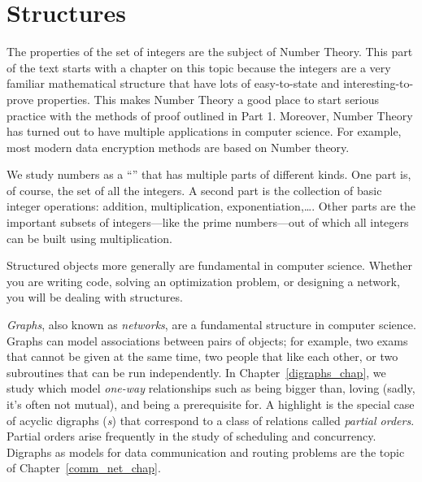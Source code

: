 \part{Structures}
\label{part:structures}

\partintro
{}

The properties of the set of integers are the subject of Number
Theory.  This part of the text starts with a chapter on this topic
because the integers are a very familiar mathematical structure that
have lots of easy-to-state and interesting-to-prove properties.  This
makes Number Theory a good place to start serious practice with the
methods of proof outlined in Part 1.  Moreover, Number Theory has
turned out to have multiple applications in computer science.  For
example, most modern data encryption methods are based on Number
theory.

We study numbers as a ``'' that has multiple parts of
different kinds.  One part is, of course, the set of all the integers.
A second part is the collection of basic integer operations:
addition, multiplication, exponentiation,\dots.  Other parts are the
important subsets of integers---like the prime numbers---out of which
all integers can be built using multiplication.

Structured objects more generally are fundamental in computer science.
Whether you are writing code, solving an optimization problem, or
designing a network, you will be dealing with structures.

\iffalse
The better you can understand the structure, the better your results will be.
And if you can reason about structure, then you will be in a good
position to convince others (and yourself) that your results are
worthy.\fi

\emph{Graphs}, also known as \emph{networks}, are a fundamental
structure in computer science.  Graphs can model associations between
pairs of objects; for example, two exams that cannot be given at the
same time, two people that like each other, or two subroutines that
can be run independently.  In Chapter~\ref{digraphs_chap}, we study
\emph{} which model \emph{one-way} relationships
such as being bigger than, loving (sadly, it's often not mutual), and
being a prerequisite for.  A highlight is the special case of acyclic
digraphs (\emph{s}) that correspond to a class of relations
called \emph{partial orders}.  Partial orders arise frequently in the
study of scheduling and concurrency.  Digraphs as models for data
communication and routing problems are the topic of
Chapter~\ref{comm_net_chap}.

